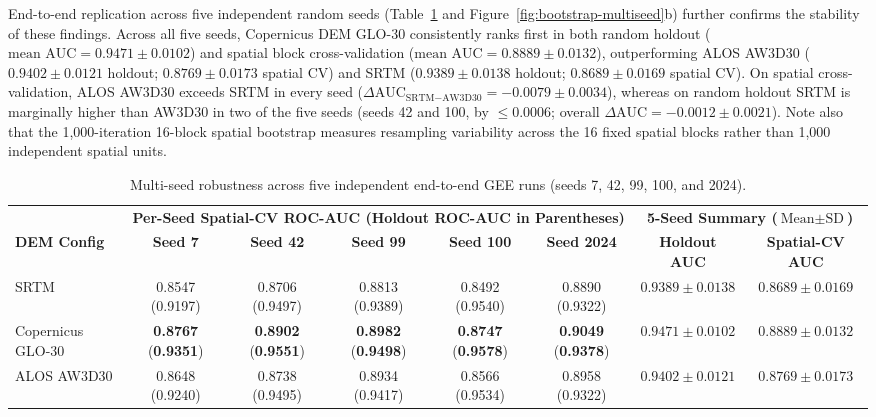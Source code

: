 \documentclass[11pt,twoside]{article}
\begin{document}
End-to-end replication across five independent random seeds (Table~\ref{tab:multiseed-summary} and Figure~\ref{fig:bootstrap-multiseed}b) further confirms the stability of these findings. Across all five seeds, Copernicus DEM GLO-30 consistently ranks first in both random holdout ($\text{mean AUC} = 0.9471 \pm 0.0102$) and spatial block cross-validation ($\text{mean AUC} = 0.8889 \pm 0.0132$), outperforming ALOS AW3D30 ($0.9402 \pm 0.0121$ holdout; $0.8769 \pm 0.0173$ spatial CV) and SRTM ($0.9389 \pm 0.0138$ holdout; $0.8689 \pm 0.0169$ spatial CV). On spatial cross-validation, ALOS AW3D30 exceeds SRTM in every seed ($\Delta\text{AUC}_{\text{SRTM}-\text{AW3D30}} = -0.0079 \pm 0.0034$), whereas on random holdout SRTM is marginally higher than AW3D30 in two of the five seeds (seeds 42 and 100, by $\le 0.0006$; overall $\Delta\text{AUC} = -0.0012 \pm 0.0021$). Note also that the 1,000-iteration 16-block spatial bootstrap measures resampling variability across the 16 fixed spatial blocks rather than 1,000 independent spatial units.

\begin{table}[!htbp]
\small
\centering
\caption{Multi-seed robustness across five independent end-to-end GEE runs (seeds 7, 42, 99, 100, and 2024).}
\label{tab:multiseed-summary}
\begin{adjustbox}{max width=\textwidth}
\begin{tabular}{l ccccc c c}
\toprule
& \multicolumn{5}{c}{\textbf{Per-Seed Spatial-CV ROC-AUC (Holdout ROC-AUC in Parentheses)}} & \multicolumn{2}{c}{\textbf{5-Seed Summary ($\text{Mean} \pm \text{SD}$)}} \\
\cmidrule(lr){2-6} \cmidrule(lr){7-8}
\textbf{DEM Config} & \textbf{Seed 7} & \textbf{Seed 42} & \textbf{Seed 99} & \textbf{Seed 100} & \textbf{Seed 2024} & \textbf{Holdout AUC} & \textbf{Spatial-CV AUC} \\
\midrule
SRTM & 0.8547 (0.9197) & 0.8706 (0.9497) & 0.8813 (0.9389) & 0.8492 (0.9540) & 0.8890 (0.9322) & $0.9389 \pm 0.0138$ & $0.8689 \pm 0.0169$ \\
Copernicus GLO-30 & \textbf{0.8767} (\textbf{0.9351}) & \textbf{0.8902} (\textbf{0.9551}) & \textbf{0.8982} (\textbf{0.9498}) & \textbf{0.8747} (\textbf{0.9578}) & \textbf{0.9049} (\textbf{0.9378}) & $\mathbf{0.9471 \pm 0.0102}$ & $\mathbf{0.8889 \pm 0.0132}$ \\
ALOS AW3D30 & 0.8648 (0.9240) & 0.8738 (0.9495) & 0.8934 (0.9417) & 0.8566 (0.9534) & 0.8958 (0.9322) & $0.9402 \pm 0.0121$ & $0.8769 \pm 0.0173$ \\
\bottomrule
\end{tabular}
\end{adjustbox}
\end{table}
\end{document}
